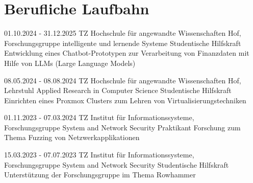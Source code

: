 \section{Berufliche Laufbahn}\label{sec:berufliche-laufbahn}



\jobentry
{01.10.2024 - 31.12.2025}
{TZ}
{Hochschule für angewandte Wissenschaften Hof, \\ Forschungsgruppe intelligente und lernende Systeme \newline}
{Studentische Hilfskraft}
{Entwicklung eines Chatbot-Prototypen zur Verarbeitung von Finanzdaten mit Hilfe von LLMs (Large Language Models)}

\jobentry
{08.05.2024 - 08.08.2024}
{TZ}
{Hochschule für angewandte Wissenschaften Hof, \\ Lehrstuhl Applied Research in Computer Science \newline}
{Studentische Hilfskraft}
{Einrichten eines Proxmox Clusters zum Lehren von Virtualisierungstechniken}

\jobentry
{01.11.2023 - 07.03.2024}
{TZ}
{Institut für Informationssysteme, \\ Forschungsgruppe System and Network Security \newline}
{Praktikant}
{Forschung zum Thema Fuzzing von Netzwerkapplikationen}

\jobentry
{15.03.2023 - 07.07.2023} %
{TZ} %
{Institut für Informationssysteme, \\ Forschungsgruppe System and Network Security \newline} %
{Studentische Hilfskraft} %
{Unterstützung der Forschungsgruppe im Thema Rowhammer} %


